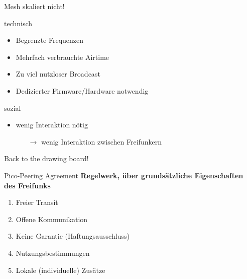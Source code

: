 \documentclass{beamer}
\begin{document}
	{
		
	}

	\begin{frame}{Mesh skaliert nicht!}
	\begin{block}{technisch}
		\begin{itemize}
			\item Begrenzte Frequenzen
			\item Mehrfach verbrauchte Airtime
			\item Zu viel nutzloser Broadcast
			\item Dedizierter Firmware/Hardware notwendig
		\end{itemize}

	\end{block}
	\begin{block}{sozial}
		\begin{itemize}
			\item wenig Interaktion nötig
			\begin{itemize}
			 \item[$\rightarrow$] wenig Interaktion zwischen Freifunkern
			\end{itemize}

		\end{itemize}
	\end{block}
	\end{frame}

	\begin{frame}[standout]
		Back to the drawing board!
	\end{frame}

	\begin{frame}{Pico-Peering Agreement}
		\textbf{Regelwerk, über grundsätzliche Eigenschaften des Freifunks}

		\begin{enumerate}
			\item Freier Transit
			\item Offene Kommunikation
			\item Keine Garantie (Haftungsausschluss)
			\item Nutzungsbestimmungen
			\item Lokale (individuelle) Zusätze
		\end{enumerate}
	\end{frame}
\end{document}
